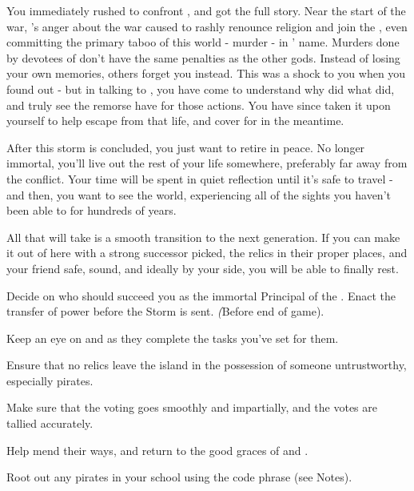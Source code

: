 \documentclass[char]{GL2020}
\begin{document}
You immediately rushed to confront \cChupAvenger{}, and got the full story. Near the start of the war, \cChupAvenger{}’s anger about the war caused \cChupAvenger{\them} to rashly renounce \cChupAvenger{\their} religion and join the \pGoaties{}, even committing the primary taboo of this world - murder - in \cGenesis{}’ name. Murders done by devotees of \cGenesis{} don’t have the same penalties as the other gods. Instead of losing your own memories, others forget you instead. This was a shock to you when you found out - but in talking to \cChupAvenger{}, you have come to understand why \cChupAvenger{\they} did what \cChupAvenger{\they} did, and truly see the remorse \cChupAvenger{\they} have for those actions. You have since taken it upon yourself to help \cChupAvenger{} escape from that life, and cover for \cChupAvenger{\them} in the meantime.

After this storm is concluded, you just want to retire in peace. No longer immortal, you’ll live out the rest of your life somewhere, preferably far away from the conflict. Your time will be spent in quiet reflection until it’s safe to travel - and then, you want to see the world, experiencing all of the sights you haven’t been able to for hundreds of years.

All that will take is a smooth transition to the next generation. If you can make it out of here with a strong successor picked, the relics in their proper places, and your friend \cChupAvenger{} safe, sound, and ideally by your side, you will be able to finally rest.

\begin{itemz}[Goals]
	\item Decide on who should succeed you as the immortal Principal of the \pSchool{}. Enact the transfer of power before the Storm is sent. \emph(Before end of game).
	\item Keep an eye on \cMusic{} and \cBeetle{} as they complete the tasks you’ve set for them.
	\item Ensure that no relics leave the island in the possession of someone untrustworthy, especially pirates.
	\item Make sure that the voting goes smoothly and impartially, and the votes are tallied accurately.
	\item Help \cChupAvenger{} mend their ways, and return to the good graces of \cEbb{} and \cFlow{}.
	\item Root out any \pShip{} pirates in your school using the code phrase (see Notes).
\end{itemz}
\end{document}
